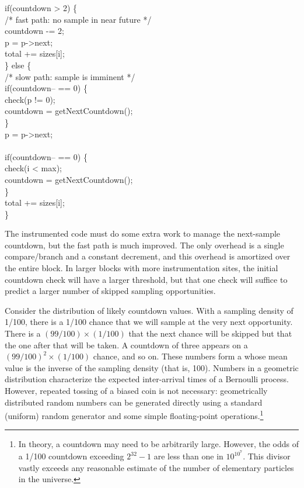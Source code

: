 \begin{code}
  if(countdown > 2) \{ \\
  \> /* fast path: no sample in near future */ \\
  \> countdown -= 2; \\
  \> \up p = p->next; \\
  \> \up total += sizes[i]; \\
  \} else \{ \\
  \> /* slow path: sample is imminent */ \\
  \> if(countdown-- == 0) \{ \\
  \>\> check(p != 0); \\
  \>\> countdown = getNextCountdown(); \\
  \> \} \\
  \> \up p = p->next; \\
  \> \\
  \> if(countdown-- == 0) \{ \\
  \>\> check(i < max); \\
  \>\> countdown = getNextCountdown(); \\
  \> \} \\
  \> \up total += sizes[i]; \\
  \}
\end{code}

The instrumented code must do some extra work to manage the
next-sample countdown, but the fast path is much improved.  The only
overhead is a single compare/branch and a constant decrement, and this
overhead is amortized over the entire block.  In larger blocks with
more instrumentation sites, the initial countdown check will have a
larger threshold, but that one check will suffice to predict a larger
number of skipped sampling opportunities.

Consider the distribution of likely countdown values.  With a sampling
density of 1/100, there is a 1/100 chance that we will sample at the
very next opportunity.  There is a $(99/100) \times (1/100)$ that the
next chance will be skipped but that the one after that will be taken.
A countdown of three appears on a $(99/100)^2 \times (1/100)$ chance,
and so on.  These numbers form a 
whose mean value is the inverse of the sampling density (that is,
100).  Numbers in a geometric distribution characterize the expected
inter-arrival times of a Bernoulli process.  However, repeated tossing
of a biased coin is not necessary: geometrically distributed random
numbers can be generated directly using a standard (uniform) random
generator and some simple floating-point operations.\footnote{In
  theory, a countdown may need to be arbitrarily large.  However, the
  odds of a 1/100 countdown exceeding $2^{32}-1$ are less than one in
  $10^{10^7}$.  This divisor vastly exceeds any reasonable estimate of
  the number of elementary particles in the universe.}

